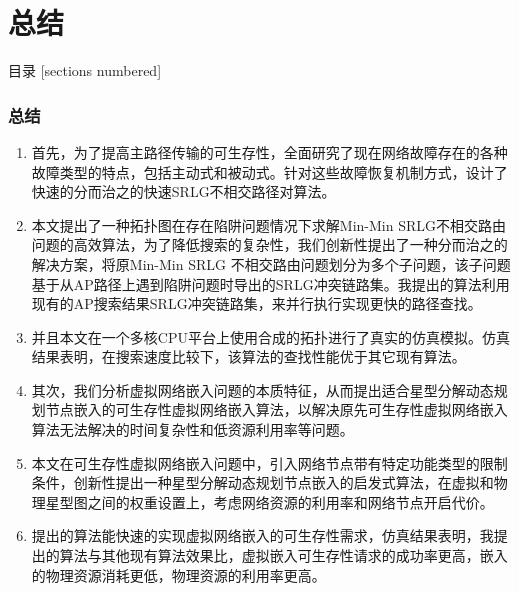 ﻿\section{总结}
\begin{frame}{目录}
    [sections numbered]
\end{frame}
\addtocounter{framenumber}{-1}  %
  
\begin{frame}
\frametitle{总结}
\begin{enumerate}
  \item 首先，为了提高主路径传输的可生存性，全面研究了现在网络故障存在的各种故障类型的特点，包括主动式和被动式。针对这些故障恢复机制方式，设计了快速的分而治之的快速SRLG不相交路径对算法。
  \item 本文提出了一种拓扑图在存在陷阱问题情况下求解Min-Min SRLG不相交路由问题的高效算法，为了降低搜索的复杂性，我们创新性提出了一种分而治之的解决方案，将原Min-Min SRLG 不相交路由问题划分为多个子问题，该子问题基于从AP路径上遇到陷阱问题时导出的SRLG冲突链路集。我提出的算法利用现有的AP搜索结果SRLG冲突链路集，来并行执行实现更快的路径查找。
  \item 并且本文在一个多核CPU平台上使用合成的拓扑进行了真实的仿真模拟。仿真结果表明，在搜索速度比较下，该算法的查找性能优于其它现有算法。
  \item 其次，我们分析虚拟网络嵌入问题的本质特征，从而提出适合星型分解动态规划节点嵌入的可生存性虚拟网络嵌入算法，以解决原先可生存性虚拟网络嵌入算法无法解决的时间复杂性和低资源利用率等问题。
  \item 本文在可生存性虚拟网络嵌入问题中，引入网络节点带有特定功能类型的限制条件，创新性提出一种星型分解动态规划节点嵌入的启发式算法，在虚拟和物理星型图之间的权重设置上，考虑网络资源的利用率和网络节点开启代价。
  \item   提出的算法能快速的实现虚拟网络嵌入的可生存性需求，仿真结果表明，我提出的算法与其他现有算法效果比，虚拟嵌入可生存性请求的成功率更高，嵌入的物理资源消耗更低，物理资源的利用率更高。
\end{enumerate}
\end{frame}
